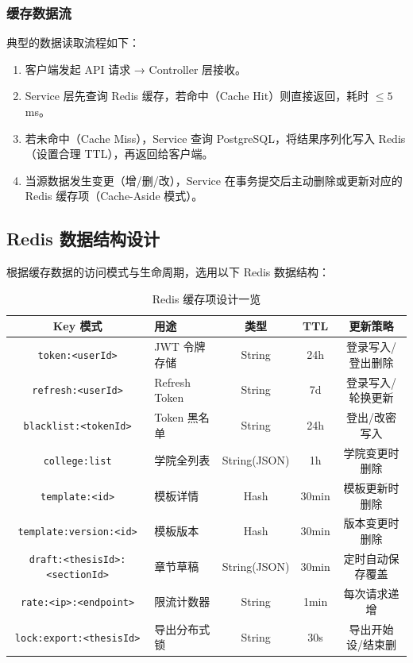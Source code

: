 \subsubsection{缓存数据流}

典型的数据读取流程如下：

\begin{enumerate}
    \item 客户端发起 API 请求 → Controller 层接收。
    \item Service 层先查询 Redis 缓存，若命中（Cache Hit）则直接返回，耗时 $\le 5$ms。
    \item 若未命中（Cache Miss），Service 查询 PostgreSQL，将结果序列化写入 Redis（设置合理 TTL），再返回给客户端。
    \item 当源数据发生变更（增/删/改），Service 在事务提交后主动删除或更新对应的 Redis 缓存项（Cache-Aside 模式）。
\end{enumerate}

\subsection{Redis 数据结构设计}

根据缓存数据的访问模式与生命周期，选用以下 Redis 数据结构：

\begin{table}[htbp]
\centering
\caption{Redis 缓存项设计一览}
\label{tab:redis-design}
\begin{tabular}{|c|p{3cm}|c|c|c|}
\hline
\textbf{Key 模式} & \textbf{用途} & \textbf{类型} & \textbf{TTL} & \textbf{更新策略} \\
\hline
\texttt{token:<userId>} & JWT 令牌存储 & String & 24h & 登录写入/登出删除 \\
\hline
\texttt{refresh:<userId>} & Refresh Token & String & 7d & 登录写入/轮换更新 \\
\hline
\texttt{blacklist:<tokenId>} & Token 黑名单 & String & 24h & 登出/改密写入 \\
\hline
\texttt{college:list} & 学院全列表 & String(JSON) & 1h & 学院变更时删除 \\
\hline
\texttt{template:<id>} & 模板详情 & Hash & 30min & 模板更新时删除 \\
\hline
\texttt{template:version:<id>} & 模板版本 & Hash & 30min & 版本变更时删除 \\
\hline
\texttt{draft:<thesisId>:<sectionId>} & 章节草稿 & String(JSON) & 30min & 定时自动保存覆盖 \\
\hline
\texttt{rate:<ip>:<endpoint>} & 限流计数器 & String & 1min & 每次请求递增 \\
\hline
\texttt{lock:export:<thesisId>} & 导出分布式锁 & String & 30s & 导出开始设/结束删 \\
\hline
\end{tabular}
\end{table}

